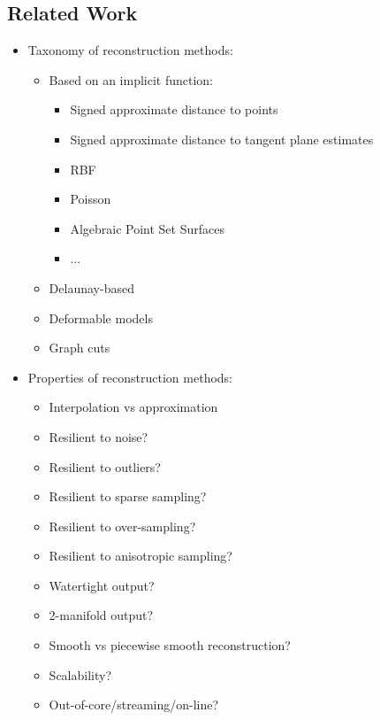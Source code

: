 \subsection{Related Work}

\begin{itemize}
\item Taxonomy of reconstruction methods:

\begin{itemize}
\item Based on an implicit function:

\begin{itemize}
\item Signed approximate distance to points \cite{cgal:cl-vmbcm-96}
\item Signed approximate distance to tangent plane estimates \cite{cgal:hddms-srup-92,BC02}
\item RBF \cite{CBC01}
\item Poisson \cite{Kazhdan06}
\item Algebraic Point Set Surfaces \cite{Guennebaud07}
\item ...
\end{itemize}

\item Delaunay-based
\item Deformable models
\item Graph cuts
\end{itemize}

\item Properties of reconstruction methods:

\begin{itemize}
\item Interpolation vs approximation
\item Resilient to noise?
\item Resilient to outliers?
\item Resilient to sparse sampling?
\item Resilient to over-sampling?
\item Resilient to anisotropic sampling?
\item Watertight output?
\item 2-manifold output?
\item Smooth vs piecewise smooth reconstruction?
\item Scalability?
\item Out-of-core/streaming/on-line?
\end{itemize}


\end{itemize}
